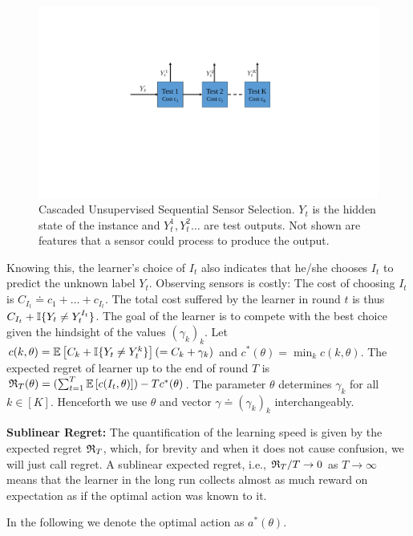 \begin{figure}[!h]
	\centering
	\includegraphics[scale=.4]{../Figures/Cascade.pdf}
	\caption{\footnotesize Cascaded Unsupervised Sequential Sensor Selection. $Y_t$ is the hidden state of the instance and $Y_t^1, Y_t^2 \ldots$ are test outputs. Not shown are features that a sensor could process to produce the output.}
	\label{fig:SensorCascade}
	\vspace{-.2cm}
\end{figure} 
Knowing this, the learner's choice of $I_t$ also indicates that he/she chooses $I_t$ to predict the unknown label $Y_t$.
Observing sensors is costly: The cost of choosing $I_t$ is $C_{I_t} \doteq c_1 + \dots + c_{I_t}$.
The total cost suffered by the learner in round $t$ is thus $C_{I_t} + \mathbb{I}\{Y_t \ne Y_t^{I_t}\}$.
The goal of the learner is to compete with the best choice given the hindsight of the values $(\gamma_k)_k$.
Let $c(k,\theta) = \mathbb{E}\left[ C_{k} +\mathbb{I}\{Y_t \ne Y_t^{k} \}\right]  (= C_k + \gamma_k)$ and $c^*(\theta) = \min_k c(k,\theta)$. The expected regret of learner up to the end of round $T$ is 
$\mathfrak{R}_T(\theta) =( \sum_{t=1}^T \mathbb{E}\left[ c(I_t,\theta) \right]) - T c^*(\theta)$. The parameter $\theta$ determines $\gamma_k$ for all $k\in [K]$. Henceforth we use $\theta$ and vector $\gamma\doteq (\gamma_k)_k$ interchangeably.

\noindent
{\bf Sublinear Regret:} The quantification of the learning speed is given by the expected regret 
$\mathfrak{R}_T$, which, for brevity and when it does not cause confusion, 
we will just call regret. A sublinear expected regret, i.e., $\mathfrak{R}_T/T \to 0$ as $T\to \infty$ means that the learner in the long run collects almost as much reward on expectation as if the optimal action was known to it.

\noindent
In the following we denote the optimal action as $a^*(\theta)$.


